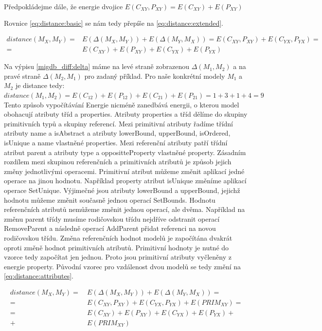 \documentclass[11pt,twoside,a4paper]{book}
\begin{document}
Předpokládejme dále, že energie dvojice $E(C_{XY}, P_{XY}) = E(C_{XY}) +
E(P_{XY})$ 

Rovnice \eqref{eq:distance:basic} se nám tedy přepíše na
\eqref{eq:distance:extended}.

\begin{align} distance(M_X,M_Y) = & E(\Delta(M_X,M_Y)) + E(\Delta(M_Y, M_X)) =
E(C_{XY}, P_{XY}) + E(C_{YX}, P_{YX}) = \nonumber \\ = & E(C_{XY}) + E(P_{XY}) +
E(C_{YX}) + E(P_{YX}) \label{eq:distance:extended}
\end{align}



Na výpisu \ref{migdb_diff:delta} máme na levé straně zobrazenou
$\Delta(M_1,M_2)$ a na pravé straně $\Delta(M_2,M_1)$ pro zadaný příklad. Pro
naše konkrétní modely $M_1$ a $M_2$ je distance tedy:\\

$distance(M_1,M_2) = E(C_{12}) + E(P_{12}) + E(C_{21}) + E(P_{21}) = 1 + 3 +
1 + 4 = 9$\\

Tento způsob vypočítávání Energie nicméně zanedbává energii, o kterou model
obohacují atributy tříd a properties. Atributy properties a tříd dělíme do
skupiny primitivních typů a skupiny referencí. Mezi primitivní atributy řadíme
třídní atributy name a isAbstract a atributy lowerBound, upperBound,
isOrdered, isUnique a name vlastněné properties. Mezi referenční atributy patří
třídní atribut parent a atributy type a oppositteProperty vlastněné property. Zásadním
rozdílem mezi skupinou referenčních a primitivních atributů je způsob jejich
změny jednotlivými operacemi. Primitivní atribut můžeme změnit aplikací jedné
operace na jinou hodnotu. Například property atribut isUnique změníme
aplikací operace SetUnique. Výjimečné jsou atributy lowerBound a upperBound,
jejichž hodnotu můžeme změnit současně jednou operací SetBounds.
Hodnotu referenčních atributů nemůžeme změnit jednou operací, ale
dvěma. Například na změnu parent třídy musíme rodičovskou třídu nejdříve
odstranit operací RemoveParent a následně operací AddParent přidat
referenci na novou rodičovskou třídu. Změna referenčních hodnot modelů je
započítána dvakrát oproti změně hodnot primitivních atributů. Primitivní
hodnoty je nutné do vzorce tedy započítat jen jednou. Proto jsou
primitivní atributy vyčleněny z energie property. Původní vzorec pro vzdálenost
dvou modelů se tedy změní na \eqref{eq:distance:attributes}.

\begin{align} distance(M_X,M_Y) = & \ E(\Delta(M_X,M_Y)) + E(\Delta(M_Y, M_X)) =
\nonumber \\ = & \ E(C_{XY}, P_{XY}) + E(C_{YX}, P_{YX}) + E(PRIM_{XY}) =
\nonumber \\ = & \ E(C_{XY}) + E(P_{XY}) + E(C_{YX}) + E(P_{YX}) + \nonumber \\
+ &\ E(PRIM_{XY})
\label{eq:distance:attributes}
\end{align}
\end{document}
